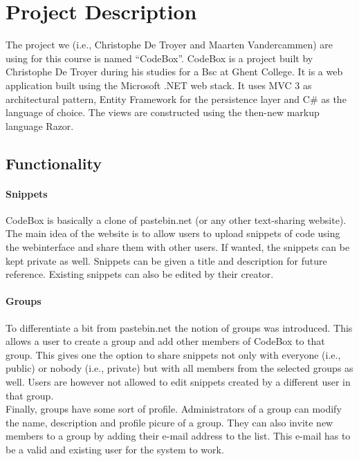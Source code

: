 \documentclass[10pt,a4paper,BCOR12mm, headexclude, footexclude,
  twoside, openright]{scrartcl}
\numberwithin{equation}{section} %
\numberwithin{figure}{section} %
\numberwithin{table}{section} %
\begin{document}
\pagestyle{plain}
\section{Project Description}
The project we (i.e., Christophe De Troyer and Maarten Vandercammen) are using
for this course is named ``CodeBox''. CodeBox is a project built by Christophe
De Troyer during his studies for a Bsc at Ghent College. It is a web
application built using the Microsoft .NET web stack. It uses MVC 3 as architectural
pattern, Entity Framework for the persistence layer and C\# as the language of
choice. The views are constructed using the then-new markup language Razor.
\subsection{Functionality}
\paragraph{Snippets}
CodeBox is basically a clone of pastebin.net (or any other text-sharing
website). The main idea of the website is to allow users to upload snippets of
code using the webinterface and share them with other users. If wanted, the
snippets can be kept private as well. Snippets can be given a title and
description for future reference. Existing snippets can also be edited by their creator.

\paragraph{Groups}
To differentiate a bit from pastebin.net the notion of groups was
introduced. This allows a user to create a group and add other members of
CodeBox to that group. This gives one the option to share snippets not only with everyone (i.e., public) or nobody (i.e., private) but with all members from the selected groups as well. 
Users are however not allowed to edit snippets created by a different user in that group.\\ Finally, groups have some sort of profile. Administrators of a group can modify the name, description and profile picure of a group. They can also invite new members to a group by adding their e-mail address to the list. This e-mail has to be a valid and existing user for the system to work.
\end{document}
